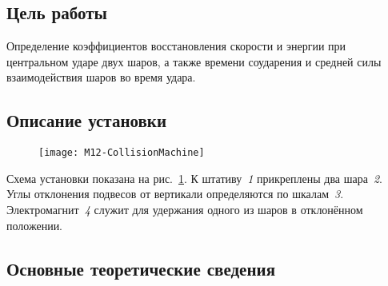 \documentclass[a4paper, 12pt]{extarticle}
\begin{document}
\MTDTitlePage
\MTDInfoPage

\setcounter{section}{12}

\subsection{Цель работы}
Определение коэффициентов восстановления скорости и энергии при центральном ударе двух шаров, а также времени соударения и средней силы взаимодействия шаров во время удара.

\subsection{Описание установки}

\begin{figure}[H]
\centering
\texttt{[image: M12-CollisionMachine]}
\caption{\label{fig:m12-equipment}}
\end{figure}

Схема установки показана на рис.~\ref{fig:m12-equipment}. К штативу~\emph{1} прикреплены два шара~\emph{2}. Углы отклонения подвесов от вертикали определяются по шкалам~\emph{3}. Электромагнит~\emph{4} служит для удержания одного из шаров в отклонённом положении.

\subsection{Основные теоретические сведения}
\end{document}
